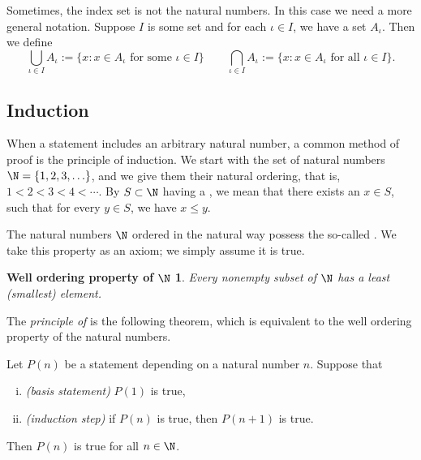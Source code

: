 \documentclass[12pt]{book}
\begin{document}
Sometimes, the index set is not the natural numbers.
 In this case we need a
more general notation.
Suppose $I$ is some set and for each $\iota \in
I$, we have a set $A_\iota$.
Then we define
\begin{equation*}
\bigcup_{\iota \in I} A_\iota := \{ x : x \in A_\iota \text{ for some $\iota \in I$}
\} 
\qquad
\bigcap_{\iota \in I} A_\iota := \{ x : x \in A_\iota \text{ for all $\iota \in I$}
\} .
\end{equation*}

\subsection*{Induction}

When a statement includes an arbitrary natural number,
a common method of proof is the principle of induction.  
We start with the set of natural numbers $\N = \{ 1,2,3,\ldots \}$, and we
give them their natural ordering, 
that is, $1 < 2 < 3 < 4 < \cdots$.
By $S \subset \N$ having a \emph{}, we mean that
there exists an $x \in S$,
such that for every
$y \in S$, we have $x \leq y$.


The natural numbers $\N$ ordered in the natural way
possess the so-called \emph{}.
We take this property
as an axiom; we simply assume it is true.

\theoremstyle{plain}
\newtheorem*{wellordprop}{Well ordering property of $\N$}
\hypertarget{wop:link}{}%
\begin{wellordprop}
Every nonempty subset of $\N$ has a least (smallest) element.
\end{wellordprop}

The \emph{principle of } is
the following theorem, which is equivalent to the well ordering property of
the natural numbers.

\begin{thm} \label{induction:thm}
Let $P(n)$ be a statement depending on a natural number $n$.  Suppose that
\begin{enumerate}[(i)]
\item \emph{(basis statement)} $P(1)$ is true,
\item \emph{(induction step)} if $P(n)$ is true, then $P(n+1)$ is true.
\end{enumerate}
Then $P(n)$ is true for all $n \in \N$.
\end{thm}
\end{document}

